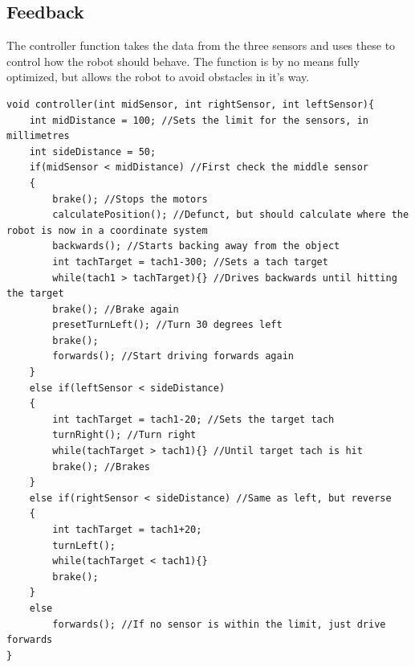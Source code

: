 \subsection{Feedback}
The controller function takes the data from the three sensors and uses these to control how the robot should behave. The function is by no means fully optimized, but allows the robot to avoid obstacles in it's way.
\begin{lstlisting}
void controller(int midSensor, int rightSensor, int leftSensor){
    int midDistance = 100; //Sets the limit for the sensors, in millimetres
    int sideDistance = 50;
    if(midSensor < midDistance) //First check the middle sensor
    {
        brake(); //Stops the motors
        calculatePosition(); //Defunct, but should calculate where the robot is now in a coordinate system
        backwards(); //Starts backing away from the object
        int tachTarget = tach1-300; //Sets a tach target
        while(tach1 > tachTarget){} //Drives backwards until hitting the target
        brake(); //Brake again
        presetTurnLeft(); //Turn 30 degrees left
        brake();
        forwards(); //Start driving forwards again
    }
    else if(leftSensor < sideDistance)
    {
        int tachTarget = tach1-20; //Sets the target tach
        turnRight(); //Turn right
        while(tachTarget > tach1){} //Until target tach is hit
        brake(); //Brakes
    }
    else if(rightSensor < sideDistance) //Same as left, but reverse
    {
        int tachTarget = tach1+20;
        turnLeft();
        while(tachTarget < tach1){}
        brake();
    }
    else
        forwards(); //If no sensor is within the limit, just drive forwards
}
\end{lstlisting}
\newpage
